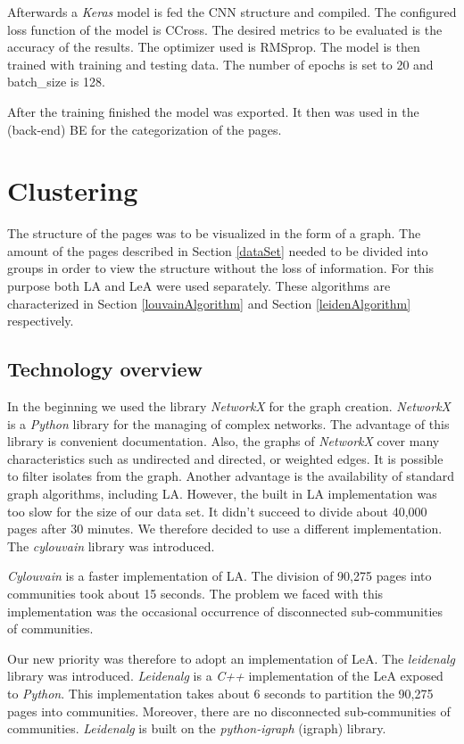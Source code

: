 Afterwards a \textit{Keras} model is fed the CNN structure and compiled. The configured loss function of the model is CCross. The desired metrics to be evaluated is the accuracy of the results. The optimizer used  is RMSprop. The model is then trained with training and testing data. The number of epochs is set to 20 and batch\_size is 128.

After the training finished the model was exported. It then was used in the (back-end) BE for the categorization of the pages.




\section{Clustering}\label{ClusteringDevelopment}
The structure of the pages was to be visualized in the form of a graph. The amount of the pages described in Section \ref{dataSet} needed to be divided into groups in order to view the structure without the loss of information. For this purpose both LA and LeA were used separately. These algorithms are characterized in Section \ref{louvainAlgorithm} and Section \ref{leidenAlgorithm} respectively. 

\subsection{Technology overview} \label{ClusteringTechonologyOverview}
In the beginning we used the library \textit{NetworkX} \cite{networkX} for the graph creation. \textit{NetworkX} is a \textit{Python} library for the managing of complex networks. The advantage of this library is convenient documentation. Also, the graphs of \textit{NetworkX} cover many characteristics such as undirected and directed, or weighted edges. It is possible to filter isolates from the graph.  Another advantage is the availability of standard graph algorithms, including LA. However, the built in LA implementation was too slow for the size of our data set. It didn't succeed to divide about 40,000 pages after 30 minutes. We therefore decided to use a different implementation. The \textit{cylouvain} library \cite{cylouvain} was introduced. 

\textit{Cylouvain} is a faster implementation of LA. The division of 90,275 pages into communities took about 15 seconds. The problem we faced with this implementation was the occasional occurrence of disconnected sub-communities of communities. 

Our new priority was therefore to adopt an implementation of LeA. The \textit{leidenalg} \cite{leidenalg} library was introduced. \textit{Leidenalg} is a \textit{C++} implementation of the LeA exposed to \textit{Python}. This implementation takes about 6 seconds to partition the 90,275 pages into communities. Moreover, there are no disconnected sub-communities of communities. \textit{Leidenalg} is built on the \textit{python-igraph} (igraph) library. 

